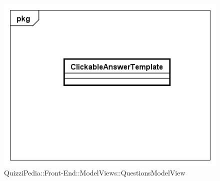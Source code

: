 			\begin{figure}[ht]
				\centering
				\includegraphics[scale=0.5,keepaspectratio]{UML/Classi/Front-End/QuizziPedia_Front-end_Templates_ClickableAnswerTemplate.png}
				\caption{QuizziPedia::Front-End::ModelViews::QuestionsModelView}
			\end{figure} \FloatBarrier
			
